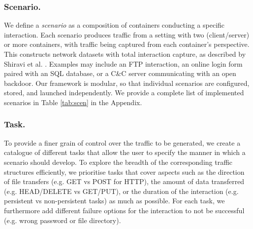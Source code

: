 \documentclass[runningheads]{llncs}
\begin{document}
\subsubsection*{Scenario.}
We define a \emph{scenario} as a composition of containers conducting a specific interaction. Each scenario produces traffic from a setting with two (client/server) or more containers, with traffic being captured from each container's perspective. This constructs network datasets with total interaction capture, as described by Shiravi et al. \cite{shiravi2012toward}.
Examples may include an FTP interaction, an online login form paired with an SQL database, or a C\&C server communicating with an open backdoor. %
Our framework is modular, so that individual scenarios are configured, stored, and launched independently. %
We provide a complete list of implemented scenarios in Table \ref{tab:scen} in the Appendix.

\subsubsection*{Task.} \label{Sec:Subscenarios}

To provide a finer grain of control over the traffic to be generated, we create a catalogue of different tasks that allow the user to specify the manner in which a scenario should develop. %
To explore the breadth of the corresponding traffic structures efficiently, we prioritise tasks that cover aspects such as the direction of file transfers (e.g. GET vs POST for HTTP), the amount of data transferred (e.g. HEAD/DELETE vs GET/PUT), or the duration of the interaction (e.g. persistent vs non-persistent tasks) as much as possible. For each task, we furthermore add different failure options for the interaction to not be successful (e.g. wrong password or file directory). 
\end{document}
